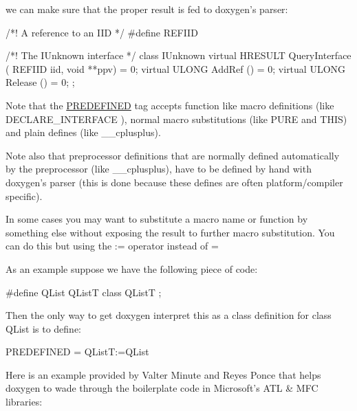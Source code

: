 we can make sure that the proper result is fed to doxygen's parser: \begin{DoxyVerb}
/*! A reference to an IID */
#define REFIID

/*! The IUnknown interface */
class  IUnknown
{
  virtual  HRESULT   QueryInterface ( REFIID iid, void **ppv) = 0;
  virtual  ULONG   AddRef () = 0;
  virtual  ULONG   Release () = 0;
};
\end{DoxyVerb}


Note that the \hyperlink{config_cfg_predefined}{PREDEFINED} tag accepts function like macro definitions (like {\ttfamily DECLARE\_\-INTERFACE} ), normal macro substitutions (like {\ttfamily PURE} and {\ttfamily THIS}) and plain defines (like {\ttfamily \_\-\_\-cplusplus}).

Note also that preprocessor definitions that are normally defined automatically by the preprocessor (like {\ttfamily \_\-\_\-cplusplus}), have to be defined by hand with doxygen's parser (this is done because these defines are often platform/compiler specific).

In some cases you may want to substitute a macro name or function by something else without exposing the result to further macro substitution. You can do this but using the {\ttfamily :=} operator instead of {\ttfamily =}

As an example suppose we have the following piece of code: \begin{DoxyVerb}
#define QList QListT
class QListT
{
};
\end{DoxyVerb}


Then the only way to get doxygen interpret this as a class definition for class QList is to define: \begin{DoxyVerb}
PREDEFINED = QListT:=QList
\end{DoxyVerb}


Here is an example provided by Valter Minute and Reyes Ponce that helps doxygen to wade through the boilerplate code in Microsoft's ATL \& MFC libraries:

